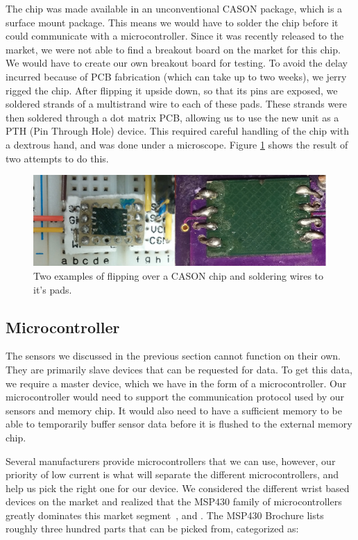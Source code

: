 The chip was made available in an unconventional CASON package,
which is a surface mount package.
This means we would have to solder the chip before it could communicate with a microcontroller.
Since it was recently released to the market,
we were not able to find a breakout board on the market for this chip.
We would have to create our own breakout board for testing.
To avoid the delay incurred because of PCB fabrication (which can take up to two weeks), we jerry rigged the chip. After flipping it upside down, so that its pins are exposed, we soldered strands of a multistrand wire to each of these pads. These strands were then soldered through a dot matrix PCB, allowing us to use the new unit as a PTH (Pin Through Hole) device. This required careful handling of the chip with a dextrous hand, and was done under a microscope. Figure \ref{Fig:CASON} shows the result of two attempts to do this. 

\begin{figure}
\begin{center}
\includegraphics[width=1.0\textwidth]{images/CASON.jpg}
\caption{Two examples of flipping over a CASON chip and soldering wires to it's pads.}
\label{Fig:CASON}
\end{center}
\end{figure}
 

\subsection{Microcontroller}
\label{Sec:MicroController}

The sensors we discussed in the previous section cannot function on their own. They are primarily slave devices that can be requested for data. To get this data, we require a master device, which we have in the form of a microcontroller. Our microcontroller would need to support the communication protocol used by our sensors and memory chip. It would also need to have a sufficient memory to be able to temporarily buffer sensor data before it is flushed to the external memory chip. 

Several manufacturers provide microcontrollers that we can use, however,
our priority of low current is what will separate the different microcontrollers,
and help us pick the right one for our device.
We considered the different wrist based devices on the market and realized that the MSP430 family of microcontrollers greatly dominates this market segment~\cite{lo2005body}, \cite{polastre2005telos} and \cite{werner2006deploying}.
The MSP430 Brochure \cite{instruments2009msp430} lists roughly three hundred parts that can be picked from, categorized as:

